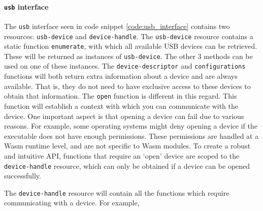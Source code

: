 \paragraph{\texttt{usb} interface}
The \texttt{usb} interface seen in code snippet \ref{code:usb_interface} contains two resources: \texttt{usb-device} and \texttt{device-handle}. The \texttt{usb-device} resource contains a static function \texttt{enumerate}, with which all available USB devices can be retrieved. These will be returned as instances of \texttt{usb-device}. The other 3 methods can be used on one of these instances. The \texttt{device-descriptor} and \texttt{configurations} functions will both return extra information about a device and are always available. That is, they do not need to have exclusive access to these devices to obtain that information. The \texttt{open} function is different in this regard. This function will establish a context with which you can communicate with the device. One important aspect is that opening a device can fail due to various reasons. For example, some operating systems might deny opening a device if the executable does not have enough permissions. These permissions are handled at a \acrshort{Wasm} runtime level, and are not specific to \acrshort{Wasm} modules. To create a robust and intuitive API, functions that require an `open' device are scoped to the \texttt{device-handle} resource, which can only be obtained if a device can be opened successfully.

The \texttt{device-handle} resource will contain all the functions which require communicating with a device. For example, 

